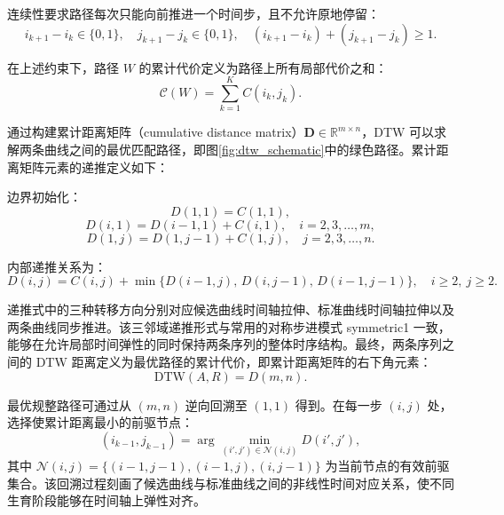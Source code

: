连续性要求路径每次只能向前推进一个时间步，且不允许原地停留：
\begin{equation}
    i_{k+1}-i_k\in\{0,1\},\quad j_{k+1}-j_k\in\{0,1\},\quad (i_{k+1}-i_k)+(j_{k+1}-j_k)\ge 1.
    \label{eq:dtw_continuity}
\end{equation}

在上述约束下，路径 \(W\) 的累计代价定义为路径上所有局部代价之和：
\begin{equation}
    \mathcal{C}(W)=\sum_{k=1}^{K}C(i_k,j_k).
    \label{eq:dtw_path_cost}
\end{equation}

通过构建累计距离矩阵（cumulative distance matrix）\(\mathbf{D}\in\mathbb{R}^{m\times n}\)，DTW 可以求解两条曲线之间的最优匹配路径，即图\ref{fig:dtw_schematic}中的绿色路径。累计距离矩阵元素的递推定义如下：

边界初始化：
\begin{equation}
    D(1,1)=C(1,1),
    \label{eq:dtw_init}
\end{equation}
\begin{equation}
    D(i,1)=D(i-1,1)+C(i,1),\quad i=2,3,\ldots,m,
    \label{eq:dtw_init_i}
\end{equation}
\begin{equation}
    D(1,j)=D(1,j-1)+C(1,j),\quad j=2,3,\ldots,n.
    \label{eq:dtw_init_j}
\end{equation}

内部递推关系为：
\begin{equation}
    D(i,j)=C(i,j)+\min\bigl\{D(i-1,j),\,D(i,j-1),\,D(i-1,j-1)\bigr\},\quad i\ge 2,\ j\ge 2.
    \label{eq:dtw_recurrence}
\end{equation}

递推式中的三种转移方向分别对应候选曲线时间轴拉伸、标准曲线时间轴拉伸以及两条曲线同步推进。该三邻域递推形式与常用的对称步进模式 symmetric1 一致，能够在允许局部时间弹性的同时保持两条序列的整体时序结构\cite{Sakoe1978,Petitjean2012}。最终，两条序列之间的 DTW 距离定义为最优路径的累计代价，即累计距离矩阵的右下角元素：
\begin{equation}
    \mathrm{DTW}(A,R)=D(m,n).
    \label{eq:dtw_distance}
\end{equation}

最优规整路径可通过从 \((m,n)\) 逆向回溯至 \((1,1)\) 得到。在每一步 \((i,j)\) 处，选择使累计距离最小的前驱节点：
\begin{equation}
    (i_{k-1},j_{k-1})=\arg\min_{(i',j')\in\mathcal{N}(i,j)}D(i',j'),
    \label{eq:dtw_backtrack}
\end{equation}
其中 \(\mathcal{N}(i,j)=\{(i-1,j-1),(i-1,j),(i,j-1)\}\) 为当前节点的有效前驱集合。该回溯过程刻画了候选曲线与标准曲线之间的非线性时间对应关系，使不同生育阶段能够在时间轴上弹性对齐。

